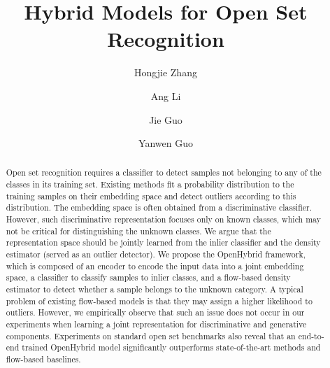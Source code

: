 \documentclass[runningheads]{llncs}
\begin{document}
\pagestyle{headings}
\mainmatter
\def\ECCVSubNumber{5859}  

\title{Hybrid Models for Open Set Recognition} 



\author{Hongjie Zhang \and
 Ang Li \and
 Jie Guo\and
 Yanwen Guo}


\maketitle
{}

\begin{abstract}
Open set recognition requires a classifier to detect samples not belonging to any of the classes in its training set. Existing methods fit a probability distribution to the training samples on their embedding space and detect outliers according to this distribution. The embedding space is often obtained from a discriminative classifier. However, such discriminative representation focuses only on known classes, which may not be critical for distinguishing the unknown classes. We argue that the representation space should be jointly learned from the inlier classifier and the density estimator (served as an outlier detector). We propose the OpenHybrid framework, which is composed of an encoder to encode the input data into a joint embedding space, a classifier to classify samples to inlier classes, and a flow-based density estimator to detect whether a sample belongs to the unknown category. A typical problem of existing flow-based models is that they may assign a higher likelihood to outliers. However, we empirically observe that such an issue does not occur in our experiments when learning a joint representation for discriminative and generative components. Experiments on standard open set benchmarks also reveal that an end-to-end trained OpenHybrid model significantly outperforms state-of-the-art methods and flow-based baselines.




\end{abstract}
\end{document}
